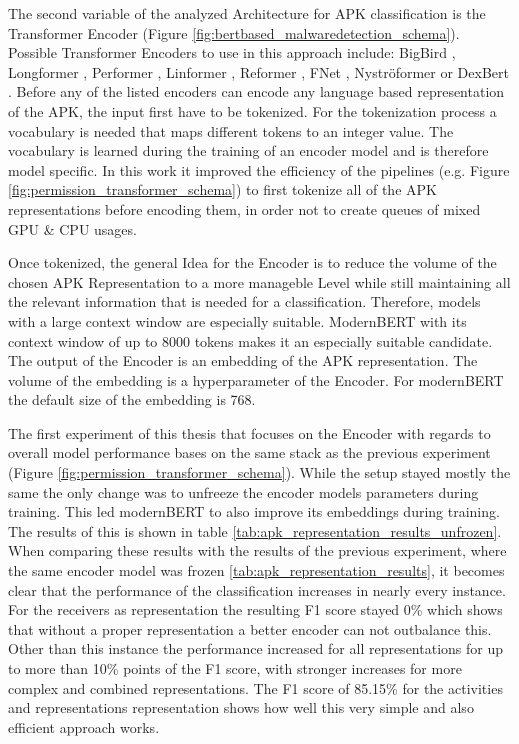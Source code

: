 The second variable of the analyzed Architecture for 
APK classification is the Transformer Encoder 
(Figure \ref{fig:bertbased_malwaredetection_schema}).
Possible Transformer Encoders to use in this approach include: 
BigBird \cite{bigbird}, Longformer \cite{longformer}, 
Performer \cite{performer}, Linformer \cite{linformer},
Reformer \cite{reformer}, FNet \cite{fnet}, 
Nyströformer \cite{nystromformer} or DexBert \cite{dexbert}.
Before any of the listed encoders can encode any language based representation
of the APK, the input first have to be tokenized.
For the tokenization process a vocabulary is needed that maps different tokens
to an integer value. The vocabulary is learned during the training of an encoder model 
and is therefore model specific. In this work it improved the efficiency of 
the pipelines (e.g. Figure \ref{fig:permission_transformer_schema}) 
to first tokenize all of the APK representations before encoding them, 
in order not to create queues of mixed GPU \& CPU usages.

Once tokenized, the general Idea for the Encoder is to reduce the volume of the chosen
APK Representation to a more manageble Level while still maintaining all 
the relevant information that is needed for a classification.
Therefore, models with a large context window are especially suitable.
ModernBERT \cite{modernbert} with its context window of up to 8000 tokens
makes it an especially suitable candidate.
The output of the Encoder is an embedding of the APK representation.
The volume of the embedding is a hyperparameter of the Encoder.
For modernBERT the default size of the embedding is 768.

The first experiment of this thesis that focuses on the Encoder with regards
to overall model performance bases on the same stack as the previous experiment
(Figure \ref{fig:permission_transformer_schema}).
While the setup stayed mostly the same the only change was to unfreeze the 
encoder models parameters during training. This led modernBERT to 
also improve its embeddings during training. The results of this is shown in 
table \ref{tab:apk_representation_results_unfrozen}. When comparing these 
results with the results of the previous experiment, where the same 
encoder model was frozen \ref{tab:apk_representation_results}, it becomes 
clear that the performance of the classification increases in nearly every instance.
For the receivers as representation the resulting F1 score stayed 0\% which shows
that without a proper representation a better encoder can not outbalance this.
Other than this instance the performance increased for all representations
for up to more than 10\% points of the F1 score, with stronger increases for
more complex and combined representations. The F1 score of 85.15\% for the 
activities and representations representation shows how well this very simple
and also efficient approach works.

